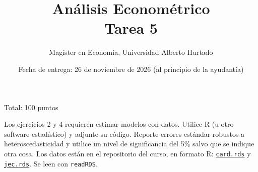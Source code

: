 \documentclass[letterpaper,11pt]{article}
\begin{document}
	\title {Análisis Econométrico  \\ Tarea 5}
	\author{Magíster en Economía, Universidad Alberto Hurtado}
	\date{Fecha de entrega: 26 de noviembre de 2026 (al principio de la ayudantía)}

\maketitle

Total: 100 puntos

Los ejercicios 2 y 4 requieren estimar modelos con datos. Utilice R (u otro software
estadístico) y adjunte su código. Reporte errores estándar robustos a
heteroscedasticidad y utilice un nivel de significancia del 5\% salvo que se indique otra
cosa. Los datos están en el repositorio del curso, en formato R:
\href{https://github.com/ramirode/econometria_mae/raw/main/problem-sets/datos/card.rds}{\texttt{card.rds}} y
\href{https://github.com/ramirode/econometria_mae/raw/main/problem-sets/datos/jec.rds}{\texttt{jec.rds}}.
Se leen con \texttt{readRDS}.
\end{document}
